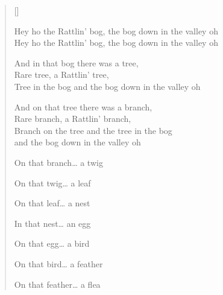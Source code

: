 \pagebreak
\settowidth{\versewidth}{Hey ho the Rattlin' bog the bog down in the valley oh}
\begin{verse}[\versewidth]
\\
\begin{chorus}
Hey ho the Rattlin' bog, the bog down in the valley oh\\
Hey ho the Rattlin' bog, the bog down in the valley oh
\end{chorus}

\begin{patverse}
And in that bog there was a tree,\\
Rare tree, a Rattlin' tree,\\
Tree in the bog and the bog down in the valley oh
\end{patverse}

\begin{patverse}
And on that tree there was a branch,\\
Rare branch, a Rattlin' branch,\\
Branch on the tree and the tree in the bog\\
and the bog down in the valley oh
\end{patverse}

On that branch\dots{} a twig

On that twig\dots{} a leaf

On that leaf\dots{} a nest

In that nest\dots{} an egg

On that egg\dots{} a bird

On that bird\dots{} a feather

On that feather\dots{} a flea
\end{verse}
